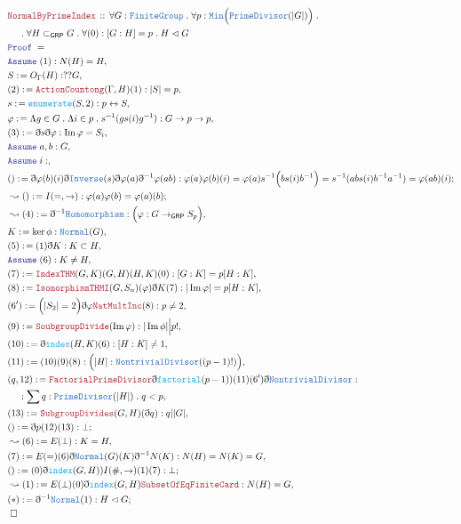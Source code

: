 \documentclass[12pt]{scrartcl}
\newcommand{\TYPE}[1]{\textcolor{NavyBlue}{\mathtt{#1}}}
\newcommand{\FUNC}[1]{\textcolor{Cerulean}{\mathtt{#1}}}
\newcommand{\LOGIC}[1]{\textcolor{Blue}{\mathtt{#1}}}
\newcommand{\THM}[1]{\textcolor{Maroon}{\mathtt{#1}}}
\renewcommand{\.}{\; . \;}
\newcommand{\de}{: \kern 0.1pc =}
\newcommand{\Theorem}[2]{& \THM{#1} \, :: \, #2 \\ & \Proof = \\ }
\newcommand{\NewLine}{\\ & \kern 1pc}
\newcommand{\Page}[1]{ \begin{align*} #1 \end{align*}   }
\newcommand{ \bd }{ \ByDef }
\DeclareMathOperator*{\im}{Im}
\newcommand{\ToBij}{\leftrightarrow}
\newcommand{\Say}[3]{& #1 \de #2 : #3, \\}
\newcommand{\Conclude}[3]{& #1 \de #2 : #3; \\}
\newcommand{\Derive}[3]{& \leadsto #1 \de #2 : #3, \\}
\newcommand{\DeriveConclude}[3]{& \leadsto #1 \de #2 : #3 ; \\}
\newcommand{\Assume}[2]{& \LOGIC{Assume} \; #1 : #2, \\}
\newcommand{\QED}{\; \square}
\newcommand{\EndProof}{& \QED \\}
\newcommand{\ByDef}{\eth}
\newcommand{\Proof}{\LOGIC{Proof} \; }
\newcommand{\Sgrp}{\subset_{\mathsf{GRP}}}
\newcommand{\Nrml}{\vartriangleleft}
\newcommand{\FG}{\TYPE{FiniteGroup}}
\newcommand{\GRP}{\mathsf{GRP}}
\begin{document}
\Page{
	\Theorem{ NormalByPrimeIndex}{ \forall G : \FG \. \forall p : \TYPE{Min}\Big(\TYPE{PrimeDivisor}(|G|)\Big) \. 
	     \NewLine \. \forall H \Sgrp G \. \forall (0) : [G : H] = p \. H \Nrml G	  }
	\Assume{(1)}{N(H) = H }
	\Say{S}{ O_\Gamma(H)}{??G}
	\Say{(2)}{\THM{ActionCountong}(\Gamma,H)(1)}{|S| = p}
	\Say{s}{ \FUNC{enumerate}(S,2)}{ p \ToBij S}
	\Say{\varphi}{\Lambda g \in G \. \Lambda i \in p \.  s^{-1}(gs(i)g^{-1})}{G \to p \to p}
	\Say{(3)}{\bd s \bd \varphi}{\im \varphi = S_i}
	\Assume{a,b}{G}
	\Assume{i}{}
	\Conclude{()}{ \bd \varphi(b)(i) \bd \TYPE{Inverse}(s) \bd \varphi(a) \bd^{-1} \varphi(ab)}
	{  \varphi(a)\varphi(b)(i) = \varphi(a)s^{-1}\Big(bs(i)b^{-1}\Big) = s^{-1}(abs(i)b^{-1}a^{-1}) = \varphi(ab)(i)}
	\DeriveConclude{()}{I(=,\to)}{ \varphi(a)\varphi(b) = \varphi(a)(b)  }
	\Derive{(4)}{ \bd^{-1} \TYPE{Homomorphism} }{\Big( \varphi : G \to_{\GRP} S_p\Big)}
	\Say{K}{\ker \phi}{\TYPE{Normal}(G)}
	\Say{(5)}{(1)\bd K}{K \subset H}
	\Assume{(6)}{K \neq H}
	\Say{(7)}{\THM{IndexTHM}(G,K)(G,H)(H,K)(0)}{[G : K] = p [H : K ]}
	\Say{(8)}{ \THM{IsomorphismTHMI}(G,S_n)(\varphi)\bd K (7)  }{ |\im \varphi| = p [H : K]  }
	\Say{(6')}{\Big(|S_2| = 2 \Big)\bd \varphi\THM{NatMultInc}(8)}{p \neq 2}
	\Say{(9)}{\THM{SoubgroupDivide}(\im \varphi)}{  |\im \phi| \Big| p!    }
	\Say{(10)}{ \bd \FUNC{index}(H,K)(6)}{ [H : K ] \neq 1 }
	\Say{(11)}{(10)(9)(8)}{ \Big( |H| : \TYPE{NontrivialDivisor}((p-1)!)  \Big)}
	\Say{(q,12)}{ \THM{FactorialPrimeDivisor}\bd \FUNC{factorial}(p-1))(11)(6') \bd \TYPE{NontrivialDivisor}}
	{ \NewLine : \sum q : \TYPE{PrimeDivisor}(|H|) \. q < p  }
	\Say{(13)}{\THM{SubgroupDivides}(G,H)(\bd q)}{q | |G| }
	\Conclude{()}{\bd p (12)(13)}{\bot}
	\Derive{(6)}{E(\bot)}{K = H}
	\Say{(7)}{E(=)(6)\bd \TYPE{Normal}(G)(K)\bd^{-1}N(K)}{ N(H) = N(K) = G }
	\Conclude{()}{(0)\bd \FUNC{index}(G,H))I(\#,\to)(1)(7)}{\bot}
	\Derive{(1)}{E(\bot)(0)\bd \FUNC{index}(G,H)\THM{SubsetOfEqFiniteCard}}{ N(H) = G  }
	\Conclude{(*)}{\bd^{-1} \TYPE{Normal}(1)}{ H \Nrml G}
	\EndProof
}
\newpage
\end{document}
